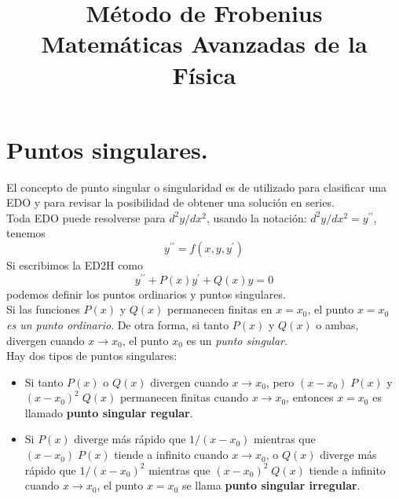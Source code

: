 
\title{ Método de Frobenius \\ \large {Matemáticas Avanzadas de la Física}}
\date{ }

\renewcommand\labelenumii{\theenumi.{\arabic{enumii}}}
\maketitle
\fontsize{14}{14}\selectfont
\section{Puntos singulares.}
El concepto de punto singular o singularidad es de utilizado para clasificar una EDO y para revisar la posibilidad de obtener una solución en series.
\\
Toda EDO puede resolverse para $d^{2}y/dx^{2}$, usando la notación: $d^{2}y/dx^{2} = y^{\prime \prime}$, tenemos
\begin{equation}
y^{\prime \prime} = f (x, y, y^{\prime})
\label{eq:ecuacion_09_74}
\end{equation}
Si escribimos la ED2H como
\begin{equation}
y^{\prime \prime} + P(x) y^{\prime}+ Q(x) y = 0
\label{eq:ecuacion_09_75}
\end{equation}
podemos definir los puntos ordinarios y puntos singulares.
\\
Si las funciones $P(x)$ y $Q(x)$ permanecen finitas en $x = x_{0}$, el punto $x = x_{0}$ \emph{es un punto ordinario}. De otra forma, si tanto $P(x)$ y $Q(x)$ o ambas, divergen cuando $x \to x_{0}$, el punto $x_{0}$ es un \emph{punto singular}.
\\
Hay dos tipos de puntos singulares:
\begin{itemize}
\item Si tanto $P(x)$ o $Q(x)$ divergen cuando $x \to x_{0}$, pero $(x - x_{0}) \; P(x)$ y $(x - x_{0})^{2} \; Q(x)$ permanecen finitas cuando $x \to x_{0}$, entonces $x = x_{0}$ es llamado \textbf{punto singular regular}.
\item Si $P(x)$ diverge más rápido que $1 / (x - x_{0})$ mientras que $(x - x_{0}) \; P(x)$ tiende a infinito cuando $x \to x_{0}$, o $Q(x)$ diverge más rápido que $1 / (x -x_{0})^{2}$ mientras que $(x -x_{0})^{2} \; Q(x)$ tiende a infinito cuando $x \to x_{0}$, el punto $x =x_{0}$ se llama \textbf{punto singular irregular}.
\end{itemize}
